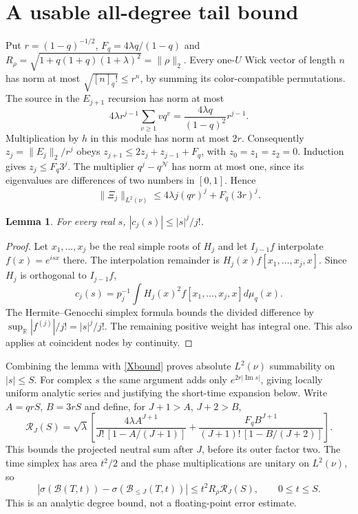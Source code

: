\documentclass[11pt]{article}
\newcommand{\NN}{\mathcal N}
\newtheorem{lemma}{Lemma}
\begin{document}
\newpage
\section{A usable all-degree tail bound}
Put $r=(1-q)^{-1/2}$, $F_q=4\lambda q/(1-q)$ and
$R_\rho=\sqrt{1+q(1+q)(1+\lambda)^2}=\|\rho\|_2$.
Every one-$U$ Wick vector of length $n$ has norm at most
$\sqrt{[n]_q!}\le r^n$, by summing its color-compatible
permutations. The source in the $E_{j+1}$ recursion has norm at most
\[
 4\lambda r^{j-1}\sum_{v\ge1}vq^v
       =\frac{4\lambda q}{(1-q)^2}r^{j-1}.
\]
Multiplication by $h$ in this module has norm at most $2r$.
Consequently $z_j=\|E_j\|_2/r^j$ obeys
$z_{j+1}\le2z_j+z_{j-1}+F_q$, with $z_0=z_1=z_2=0$.
Induction gives $z_j\le F_q3^j$. The multiplier
$q^j-q^{\NN}$ has norm at most one, since its eigenvalues are
differences of two numbers in $[0,1]$. Hence
\begin{equation}\label{Xbound}
 \|\Xi_j\|_{L^2(\nu)}\le 4\lambda j(qr)^j+F_q(3r)^j.
\end{equation}
\begin{lemma}\label{c}
For every real $s$, $|c_j(s)|\le |s|^j/j!$.
\end{lemma}
\begin{proof}
Let $x_1,\ldots,x_j$ be the real simple roots of $H_j$ and let
$I_{j-1}f$ interpolate $f(x)=e^{isx}$ there. The interpolation
remainder is $H_j(x)f[x_1,\ldots,x_j,x]$. Since $H_j$ is
orthogonal to $I_{j-1}f$,
\[
 c_j(s)=p_j^{-1}\int H_j(x)^2
               f[x_1,\ldots,x_j,x]d\mu_q(x).
\]
The Hermite--Genocchi simplex formula \cite{deBoor} bounds the
divided difference by $\sup_{\mathbb R}|f^{(j)}|/j!=|s|^j/j!$.
The remaining positive weight has integral one. This also applies
at coincident nodes by continuity.
\end{proof}
Combining the lemma with \eqref{Xbound} proves absolute $L^2(\nu)$
summability on $|s|\le S$. For complex $s$ the same argument adds
only $e^{2r|\operatorname{Im}s|}$, giving locally uniform analytic
series and justifying the short-time expansion below.
Write $A=qrS$, $B=3rS$ and define,
for $J+1>A$, $J+2>B$,
\begin{equation}\label{tail}
 \mathcal R_J(S)=\sqrt\lambda\left[
 \frac{4\lambda A^{J+1}}{J!\,[1-A/(J+1)]}
 +\frac{F_q B^{J+1}}{(J+1)!\,[1-B/(J+2)]}\right].
\end{equation}
This bounds the projected neutral sum after $J$, before its
outer factor two. The time simplex has area $t^2/2$ and the
phase multiplications are unitary on $L^2(\nu)$, so
\begin{equation}\label{Btail}
 |\sigma(\mathcal B(T,t))-\sigma(\mathcal B_{\le J}(T,t))|
       \le t^2R_\rho\mathcal R_J(S),\qquad0\le t\le S.
\end{equation}
This is an analytic degree bound, not a floating-point error estimate.
\end{document}
